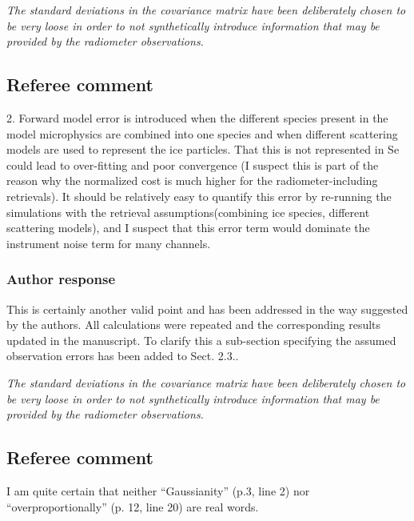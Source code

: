 \documentclass[11pt]{scrartcl}
\begin{document}
\vspace{1em}

\textit{The standard deviations in the covariance matrix have been deliberately chosen
  to be very loose in order to not synthetically introduce information that may be
  provided by the radiometer observations.}

\subsection*{Referee comment}

2. Forward model error is introduced when the different species present in the
model microphysics are combined into one species and when different scattering
models are used to represent the ice particles. That this is not represented in
Se could lead to over-fitting and poor convergence (I suspect this is part of
the reason why the normalized cost is much higher for the radiometer-including
retrievals). It should be relatively easy to quantify this error by re-running
the simulations with the retrieval assumptions(combining ice species, different
scattering models), and I suspect that this error term would dominate the
instrument noise term for many channels.

\subsubsection*{Author response}

This is certainly another valid point and has been addressed in the way suggested
by the authors. All calculations were repeated and the corresponding results
updated in the manuscript. To clarify this a sub-section specifying the assumed observation
errors has been added to Sect. 2.3..
\vspace{1em}

\textit{The standard deviations in the covariance matrix have been deliberately chosen
  to be very loose in order to not synthetically introduce information that may be
  provided by the radiometer observations.}

\subsection*{Referee comment}
I am quite certain that neither “Gaussianity” (p.3, line 2) nor “overproportionally” (p. 12,
line 20) are real words.
\end{document}
